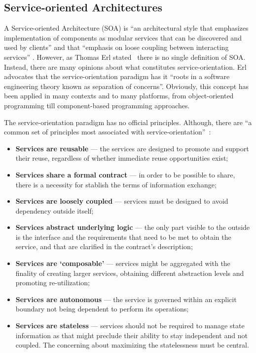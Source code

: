 \subsection{Service-oriented Architectures}


A Service-oriented Architecture (SOA) is ``an architectural style that emphasizes implementation of components as modular services that can be discovered and used by clients'' and that ``emphasis on loose coupling between interacting services'' \citep{Srinivasan2005}. However, as Thomas Erl stated~\citep{Erl2005} there is no single definition of SOA. Instead, there are many opinions about what constitutes service-orientation. Erl advocates that the service-orientation paradigm has it ``roots in a software engineering theory known as separation of concerns''. Obviously, this concept has been applied in many contexts and to many platforms, from object-oriented programming till component-based programming approaches.

The service-orientation paradigm has no official principles. Although, there are ``a common set of principles most associated with service-orientation''~\citep{Erl2005}:
\begin{itemize}
\item \textbf{Services are reusable} --- the services are designed to promote and support their reuse, regardless of whether immediate reuse opportunities exist;
\item \textbf{Services share a formal contract} --- in order to be possible to share, there is a necessity for stablish the terms of information exchange;
\item \textbf{Services are loosely coupled} --- services must be designed to avoid dependency outside itself;
\item \textbf{Services abstract underlying logic} --- the only part visible to the outside is the interface and the requirements that need to be met to obtain the service, and that are clarified in the contract's description;
\item \textbf{Services are `composable'} --- services might be aggregated with the finality of creating larger services, obtaining different abstraction levels and promoting re-utilization;
\item \textbf{Services are autonomous} --- the service is governed within an explicit boundary not being dependent to perform its operations;
\item \textbf{Services are stateless} --- services should not be required to manage state information as that might preclude their ability to stay independent and not coupled. The concerning about maximizing the statelessness must be central.
\end{itemize}

